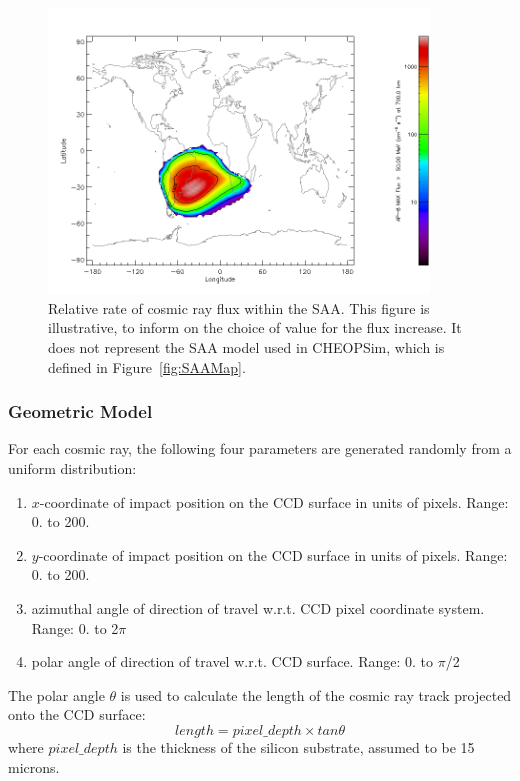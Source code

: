 \documentclass[11pt]{article}      %
\begin{document}
\begin{figure}[hbtp]
  \begin{center}
    \includegraphics[width=0.9\textwidth]{spenvis_saa_700km_treppos_map.png}
    \caption{Relative rate of cosmic ray flux within the SAA. This figure is illustrative, to inform on the choice of value for the flux increase. It does not represent the SAA model used in CHEOPSim, which is defined in Figure~\ref{fig:SAAMap}.}
    \label{fig:SAA_rate}
  \end{center}
\end{figure}

\clearpage 
\subsubsection{Geometric Model}

For each cosmic ray, the following four parameters are generated randomly from a uniform distribution:
\begin {enumerate}
\item $x$-coordinate of impact position on the CCD surface in units of pixels.  Range: 0. to 200. 
\item $y$-coordinate of impact position on the CCD surface in units of pixels.  Range: 0. to 200.
\item azimuthal angle of direction of travel w.r.t. CCD pixel coordinate system.  Range: 0. to 2$\pi$
\item polar angle of direction of travel w.r.t. CCD surface.  Range: 0. to $\pi$/2
\end{enumerate}

The polar angle $\theta$ is used to calculate the length of the cosmic ray track projected onto the CCD surface:
$$length = pixel\_depth \times tan\theta$$
where $pixel\_depth$ is the thickness of the silicon substrate, assumed to be 15 microns.
\end{document}
